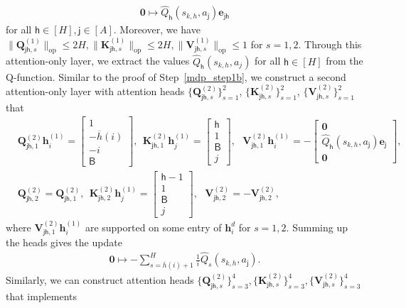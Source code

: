 \documentclass[10pt]{article}
\renewcommand{\bar}{\overline}
\newcommand{\lops}[1]{\|{#1}\|_{\mathrm{op}}}
\newcommand{\<}{\left\langle}
\renewcommand{\>}{\right\rangle}
\renewcommand{\bQ}{\mathbf{Q}}
\newcommand{\bzero}{{\mathbf 0}}
\newcommand{\partd}{{d}}
\newcommand{\state}{{s}}
\newcommand{\action}{{a}}
\newcommand{\horizon}{{H}}
\renewcommand{\horizon}{{H}}
\newcommand{\tfthres}{{\mathsf{B}}}
\newcommand{\Numact}{{A}}
\newcommand{\Qfun}{{Q}}
\newcommand{\estQfun}{{\widehat{\Qfun}}}
\def\bK{{\mathbf K}}
\def\bQ{{\mathbf Q}}
\def\bV{{\mathbf V}}
\def\be{{\mathbf e}}
\def\bh{{\mathbf h}}
\def\sj{{\mathsf{j}}}
\def\sh{{\mathsf{h}}}
\begin{document}
\begin{align*}
    \bzero\mapsto \estQfun_{\sh}(\state_{k,h},\action_\sj)\be_{\sj\sh}
\end{align*}
 for all $\sh\in[\horizon],\sj\in[\Numact]$. Moreover, we have $\lops{\bQ_{\sj\sh,s}^{(1)}}\leq2\horizon,\lops{\bK_{\sj\sh,s}^{(1)}}\leq2\horizon,\lops{\bV_{\sj\sh,s}^{(1)}}\leq1$ for $s=1,2$. Through this attention-only layer, we extract the values $\estQfun_\sh(\state_{k,h},\action_j)$ for all $\sh\in[\horizon]$ from the Q-function.
Similar to the proof of Step~\ref{mdp_step1b}, we construct a second attention-only layer with attention heads   $\{\bQ_{\sj\sh,s}^{(2)}\}^2_{s=1}$, $\{\bK_{\sj\sh,s}^{(2)}\}^2_{s=1}$, $\{\bV_{\sj\sh,s}^{(2)}\}^2_{s=1}$ that
\begin{align*}
  & \bQ_{\sj\sh,1}^{(2)}\bh_i^{(1)} =\begin{bmatrix}
       1\\-\bar{h}(i)\\-i\\
       \tfthres
   \end{bmatrix},~~ \bK_{\sj\sh,1}^{(2)}\bh_j^{(1)} =\begin{bmatrix}
   \sh\\ 1 \\\tfthres\\ j
   \end{bmatrix},~~~
   \bV_{\sj\sh,1}^{(2)}\bh_i^{(1)} =-\begin{bmatrix}
       \bzero \\  \estQfun_\sh(\state_{k,h},\action_\sj)\be_{\sj}\\
       \bzero
   \end{bmatrix},
   \\
   & \bQ_{\sj\sh,2}^{(2)}=\bQ_{\sj\sh,1}^{(2)},~~ \bK_{\sj\sh,2}^{(2)}\bh_j^{(1)} =\begin{bmatrix}
   \sh-1\\ 1 \\\tfthres\\ j
   \end{bmatrix},~~~
   \bV_{\sj\sh,2}^{(2)} =-  \bV_{\sj\sh,2}^{(2)},
\end{align*} where $ \bV_{\sj\sh,1}^{(2)}\bh_i^{(1)}$ are supported on some entry of $\bh_i^\partd$ for $s=1,2$.
Summing up the heads gives the update
\begin{align*}
    \bzero\mapsto -\sum_{s=\bar{h}(i)+1}^{\horizon}\frac{1}{i}\estQfun_{s}(\state_{k,h},\action_\sj).
\end{align*}
Similarly, we can construct attention heads   $\{\bQ_{\sj\sh,s}^{(2)}\}^4_{s=3},\{\bK_{\sj\sh,s}^{(2)}\}^4_{s=3},\{\bV_{\sj\sh,s}^{(2)}\}^4_{s=3}$ that implements
\end{document}
